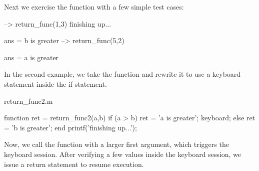 Next we exercise the function with a few simple test cases\-:


\begin{DoxyVerbInclude}
--> return_func(1,3)
finishing up...

ans = 
b is greater
--> return_func(5,2)

ans = 
a is greater
\end{DoxyVerbInclude}


In the second example, we take the function and rewrite it to use a {\ttfamily keyboard} statement inside the {\ttfamily if} statement.

\begin{DoxyVerb}     return_func2.m
\end{DoxyVerb}



\begin{DoxyVerbInclude}
function ret = return_func2(a,b)
  if (a > b)
     ret = 'a is greater';
     keyboard;
  else
     ret = 'b is greater';
  end
  printf('finishing up...\n');
\end{DoxyVerbInclude}


Now, we call the function with a larger first argument, which triggers the {\ttfamily keyboard} session. After verifying a few values inside the {\ttfamily keyboard} session, we issue a {\ttfamily return} statement to resume execution.


